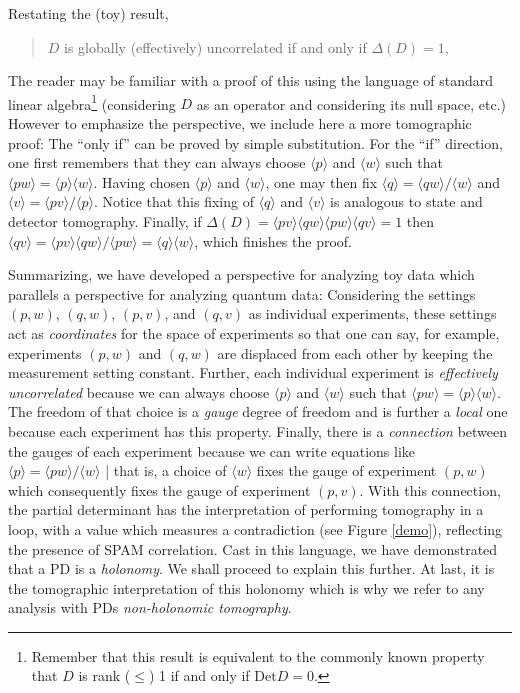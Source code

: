 \documentclass[pra, 10pt, notitlepage, twocolumn]{revtex4-1}
\newcommand{\Det}{\mathrm{Det}}
\begin{document}
Restating the (toy) result,
\begin{verse}\centering
	$D$ is globally (effectively) uncorrelated if and only if $\Delta(D)=1$,
\end{verse}
The reader may be familiar with a proof of this using the language of standard linear algebra\footnote{
Remember that this result is equivalent to the commonly known property that $D$ is rank ($\le$) 1 if and only if $\Det D = 0$.}
(considering $D$ as an operator and considering its null space, etc.)
However to emphasize the perspective, we include here a more tomographic proof:
The ``only if'' can be proved by simple substitution.
For the ``if'' direction, one first remembers that they can always choose $\langle p \rangle$ and $\langle w \rangle$ such that $\langle pw \rangle = \langle p \rangle \langle w \rangle$.
Having chosen $\langle p \rangle$ and $\langle w \rangle$, one may then fix $\langle q \rangle = \langle qw \rangle/\langle w \rangle$ and $\langle v \rangle = \langle pv \rangle/\langle p \rangle$.
Notice that this fixing of $\langle q \rangle$ and $\langle v \rangle$ is analogous to state and detector tomography.
Finally, if $\Delta(D) = {\langle pv \rangle\langle qw \rangle}{\langle pw \rangle \langle qv \rangle}=1$
then $\langle qv \rangle = \langle pv \rangle\langle qw \rangle/\langle pw \rangle = \langle q \rangle \langle w \rangle$, which finishes the proof.


Summarizing, we have developed a perspective for analyzing toy data which parallels a perspective for analyzing quantum data:
Considering the settings $(p,w)$, $(q,w)$, $(p,v)$, and $(q,v)$ as individual experiments,
these settings act as \emph{coordinates} for the space of experiments so that one can say, for example,
experiments $(p,w)$ and $(q,w)$ are displaced from each other by keeping the measurement setting constant.
Further, each individual experiment is \emph{effectively uncorrelated} because we can always choose $\langle p \rangle$ and $\langle w \rangle$ such that $\langle pw \rangle = \langle p \rangle \langle w \rangle$.
The freedom of that choice is a \emph{gauge} degree of freedom and is further a \emph{local} one because each experiment has this property.
Finally, there is a \emph{connection} between the gauges of each experiment
because we can write equations like $\langle p \rangle = \langle pw \rangle/\langle w \rangle$ | 
that is, a choice of $\langle w \rangle$ fixes the gauge of experiment $(p,w)$ which consequently fixes the gauge of experiment $(p,v)$.
With this connection, the partial determinant has the interpretation of performing tomography in a loop,
with a value which measures a contradiction (see Figure \ref{demo}), reflecting the presence of SPAM correlation.
Cast in this language, we have demonstrated that a PD is a \emph{holonomy}.
We shall proceed to explain this further.
At last, it is the tomographic interpretation of this holonomy which is why we refer to any analysis with PDs \emph{non-holonomic tomography}.
\end{document}
